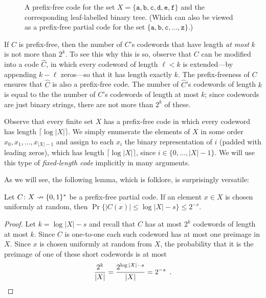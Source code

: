 \documentclass{patmorin}
\begin{document}
\begin{figure}
  \caption{A prefix-free code for the set
    $X=\{\mathtt{a},\mathtt{b},\mathtt{c},\mathtt{d},\mathtt{e},\mathtt{f}\}$
    and the corresponding leaf-labelled binary tree. (Which can also be viewed as a prefix-free partial code for the set $\{\mathtt{a},\mathtt{b},\mathtt{c},\ldots,\mathtt{z}\}$.)}
\end{figure}

If $C$ is prefix-free, then the number of $C$'s codewords that have length
\emph{at most} $k$ is not more than $2^k$. To see this why this is so,
observe that $C$ can be modified into a code $\hat C$, in which every
codeword of length $\ell <k$ is extended---by appending $k-\ell$ zeros---so that
it has length exactly $k$. The prefix-freeness of $C$ ensures that $\hat
C$ is also a prefix-free code. The number of $\hat C$'s codewords of
length $k$ is equal to the the number of $C$'s codewords of length at
most $k$; since codewords are just binary strings, there are not more
than $2^k$ of these.

Observe that every finite set $X$ has a prefix-free code in which every
codeword has length $\lceil\log |X|\rceil$. We simply enumerate the
elements of $X$ in some order $x_0,x_1,\ldots,x_{|X|-1}$ and assign to
each $x_i$ the binary representation of $i$ (padded with leading zeros),
which has length $\lceil\log |X|\rceil$, since $i\in\{0,\ldots,|X|-1\}$.
We will use this type of \emph{fixed-length code} implicitly in many arguments.


As we will see, the following lemma, which is folklore, is surprisingly
versatile:
\begin{lem}
  Let $C\colon X\nrightarrow \{0,1\}^*$ be a prefix-free partial code. If
  an element $x\in X$ is chosen uniformly at random, then $\Pr\{|C(x)|\le
  \log|X|-s\}\le 2^{-s}$.
\end{lem}

\begin{proof}
  Let $k=\log|X|-s$ and recall that $C$ has at most $2^{k}$ codewords
  of length at most $k$.  Since $C$ is one-to-one each such codeword has
  at most one preimage in $X$.  Since $x$ is chosen uniformly at random
  from $X$, the probability that it is the preimage of one of these
  short codewords is at most
  \[
     \frac{2^k}{|X|} = \frac{2^{\log|X|-s}}{|X|} = 2^{-s} \enspace . \qedhere 
  \]
\end{proof}
\end{document}
